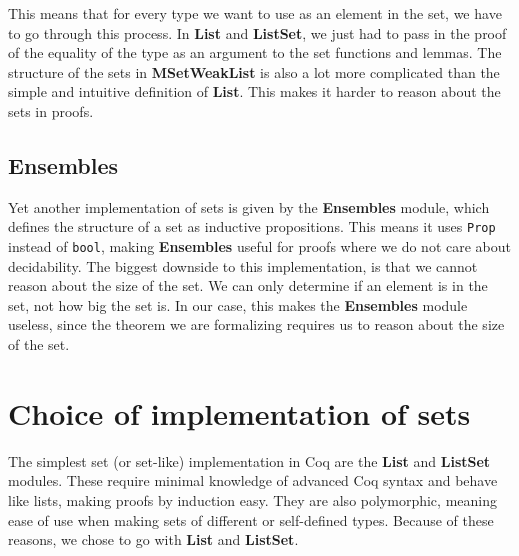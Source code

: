 This means that for every type we want to use as an element in the set, we have to go through this process.
In \textbf{List} and \textbf{ListSet}, we just had to pass in the proof of the equality of the type as an argument to the set functions and lemmas.
The structure of the sets in \textbf{MSetWeakList} is also a lot more complicated than the simple and intuitive definition of \textbf{List}.
This makes it harder to reason about the sets in proofs.

\subsection{Ensembles}

Yet another implementation of sets is given by the \textbf{Ensembles} module, which defines the structure of a set as inductive propositions.
This means it uses \lstinline{Prop} instead of \lstinline{bool},
making \textbf{Ensembles} useful for proofs where we do not care about decidability.
The biggest downside to this implementation, is that we cannot reason about the size of the set.
We can only determine if an element is in the set, not how big the set is.
In our case, this makes the \textbf{Ensembles} module useless, since the theorem we are formalizing requires us to reason about the
size of the set.

\section{Choice of implementation of sets}

The simplest set (or set-like) implementation in Coq are the \textbf{List} and \textbf{ListSet} modules.
These require minimal knowledge of advanced Coq syntax and behave like lists, making proofs by induction easy.
They are also polymorphic, meaning ease of use when making sets of different or self-defined types.
Because of these reasons, we chose to go with \textbf{List} and \textbf{ListSet}.
